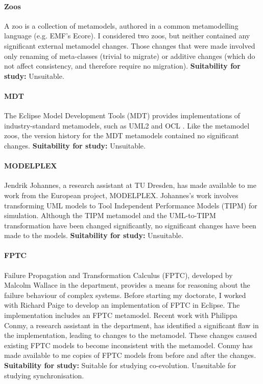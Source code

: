 \paragraph{Zoos} %
\label{par:zoos}
A zoo is a collection of metamodels, authored in a common metamodelling language (e.g. EMF's Ecore). I considered two zoos, but neither contained any significant external metamodel changes. Those changes that were made involved only renaming of meta-classes (trivial to migrate) or additive changes (which do not affect consistency, and therefore require no migration). \textbf{Suitability for study:} Unsuitable.

\paragraph{MDT} %
\label{par:mdt}
The Eclipse Model Development Tools (MDT) \cite{mdt} provides implementations of industry-standard metamodels, such as UML2 \cite{uml212} and OCL \cite{ocl2}. Like the metamodel zoos, the version history for the MDT metamodels contained no significant changes. \textbf{Suitability for study:} Unsuitable.

\paragraph{MODELPLEX} %
\label{par:modelplex}
Jendrik Johannes, a research assistant at TU Dresden, has made available to me work from the European project, MODELPLEX. Johannes's work involves transforming UML models to Tool Independent Performance Models (TIPM) for simulation. Although the TIPM metamodel and the UML-to-TIPM transformation have been changed significantly, no significant changes have been made to the models. \textbf{Suitability for study:} Unsuitable.

\paragraph{FPTC} %
\label{par:fptc}
Failure Propagation and Transformation Calculus (FPTC), developed by Malcolm Wallace in the department, provides a means for reasoning about the failure behaviour of complex systems. Before starting my doctorate, I worked with Richard Paige to develop an implementation of FPTC in Eclipse. The implementation includes an FPTC metamodel. Recent work with Philippa Conmy, a research assistant in the department, has identified a significant flaw in the implementation, leading to changes to the metamodel. These changes caused existing FPTC models to become inconsistent with the metamodel. Conmy has made available to me copies of FPTC models from before and after the changes. \textbf{Suitability for study:} Suitable for studying co-evolution. Unsuitable for studying synchronisation.

